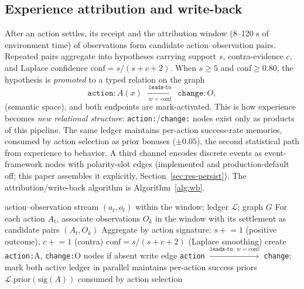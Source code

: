 \documentclass[10pt,a4paper]{article}
\begin{document}
\subsection{Experience attribution and write-back}
\label{sec:arch-wb}
After an action settles, its receipt and the attribution window (8--120 s of environment time) of observations form candidate action--observation pairs. Repeated pairs aggregate into hypotheses carrying support $s$, contra-evidence $c$, and Laplace confidence $\mathrm{conf}=s/(s+c+2)$. When $s\ge 5$ and $\mathrm{conf}\ge 0.80$, the hypothesis is \emph{promoted} to a typed relation on the graph
\begin{equation}
\mathtt{action:}A(x) \;\xrightarrow[\;w=\mathrm{conf}\;]{\;\texttt{leads-to}\;}\; \mathtt{change:}O,
\label{eq:wb}
\end{equation}
(semantic space), and both endpoints are mark-activated. This is how experience becomes \emph{new relational structure}: \texttt{action:}/\texttt{change:} nodes exist only as products of this pipeline. The same ledger maintains per-action success-rate memories, consumed by action selection as prior bonuses ($\pm0.05$), the second statistical path from experience to behavior. A third channel encodes discrete events as event-framework nodes with polarity-slot edges (implemented and production-default off; this paper assembles it explicitly, Section~\ref{sec:res-persist}). The attribution/write-back algorithm is Algorithm~\ref{alg:wb}.

\begin{algorithm}[t]
\caption{Attribution--write-back: experience to relational knowledge}\label{alg:wb}
\begin{algorithmic}[1]
\Require action--observation stream $(a_t,o_t)$ within the window; ledger $\mathcal{L}$; graph $G$
\State For each action $A_t$, associate observations $O_k$ in the window with its settlement as candidate pairs $(A_t,O_k)$
\State Aggregate by action signature: $s\mathrel{+}=1$ (positive outcome), $c\mathrel{+}=1$ (contra)
\State $\mathrm{conf}=s/(s+c+2)$ (Laplace smoothing)
  \State create \texttt{action:}A, \texttt{change:}O nodes if absent
  \State write edge \texttt{action} $\xrightarrow{\texttt{leads-to},\ w=\mathrm{conf}}$ \texttt{change}; mark both active
\EndIf
\State ledger in parallel maintains per-action success priors $\mathcal{L}.\mathrm{prior}(\mathrm{sig}(A))$ consumed by action selection
\end{algorithmic}
\end{algorithm}
\end{document}
